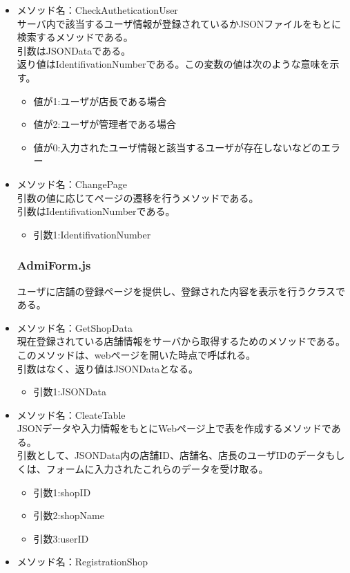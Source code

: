 \documentclass[a4j]{jarticle}
\begin{document}
\begin{itemize}
\item メソッド名：CheckAutheticationUser\\

サーバ内で該当するユーザ情報が登録されているかJSONファイルをもとに検索するメソッドである。\\
引数はJSONDataである。\\
返り値はIdentifivationNumberである。この変数の値は次のような意味を示す。
	\begin{itemize}
		\item 値が1:ユーザが店長である場合
		\item 値が2:ユーザが管理者である場合
		\item 値が0:入力されたユーザ情報と該当するユーザが存在しないなどのエラー
	\end{itemize}


\item メソッド名：ChangePage\\

引数の値に応じてページの遷移を行うメソッドである。\\
引数はIdentifivationNumberである。

	\begin{itemize}
		\item 引数1:IdentifivationNumber
	\end{itemize}
\subsubsection{AdmiForm.js}
ユーザに店舗の登録ページを提供し、登録された内容を表示を行うクラスである。

\item メソッド名：GetShopData\\

現在登録されている店舗情報をサーバから取得するためのメソッドである。このメソッドは、webページを開いた時点で呼ばれる。\\
引数はなく、返り値はJSONDataとなる。
	\begin{itemize}
		\item 引数1:JSONData
	\end{itemize}

\item メソッド名：CleateTable\\
JSONデータや入力情報をもとにWebページ上で表を作成するメソッドである。\\
引数として、JSONData内の店舗ID、店舗名、店長のユーザIDのデータもしくは、フォームに入力されたこれらのデータを受け取る。
	\begin{itemize}
		\item 引数1:shopID
		\item 引数2:shopName
		\item 引数3:userID
	\end{itemize}
\item メソッド名：RegistrationShop\\


\end{itemize}
\end{document}
